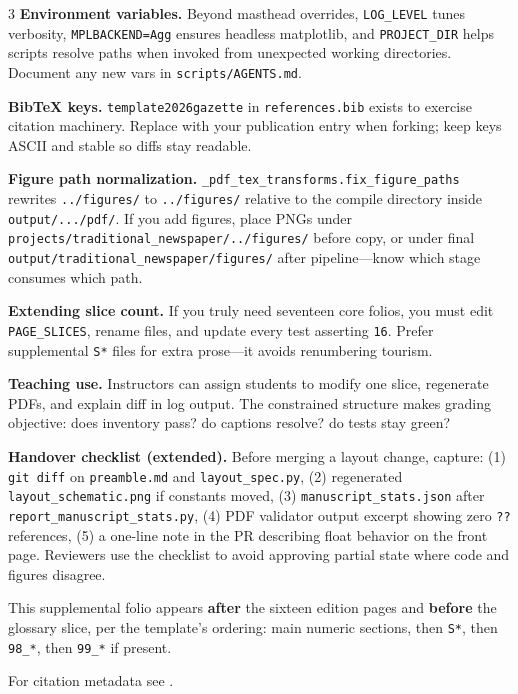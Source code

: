 \documentclass[
]{article}
\begin{document}
\begin{multicols}{3}
\textbf{Environment variables.} Beyond masthead overrides,
\texttt{LOG\_LEVEL} tunes verbosity, \texttt{MPLBACKEND=Agg} ensures
headless matplotlib, and \texttt{PROJECT\_DIR} helps scripts resolve
paths when invoked from unexpected working directories. Document any new
vars in \texttt{scripts/AGENTS.md}.

\textbf{BibTeX keys.} \texttt{template2026gazette} in
\texttt{references.bib} exists to exercise citation machinery. Replace
with your publication entry when forking; keep keys ASCII and stable so
diffs stay readable.

\textbf{Figure path normalization.}
\texttt{\_pdf\_tex\_transforms.fix\_figure\_paths} rewrites
\texttt{../figures/} to \texttt{../figures/} relative to the compile
directory inside \texttt{output/.../pdf/}. If you add figures, place
PNGs under \texttt{projects/traditional\_newspaper/../figures/} before
copy, or under final \texttt{output/traditional\_newspaper/figures/}
after pipeline---know which stage consumes which path.

\textbf{Extending slice count.} If you truly need seventeen core folios,
you must edit \texttt{PAGE\_SLICES}, rename files, and update every test
asserting \texttt{16}. Prefer supplemental \texttt{S*} files for extra
prose---it avoids renumbering tourism.

\textbf{Teaching use.} Instructors can assign students to modify one
slice, regenerate PDFs, and explain diff in log output. The constrained
structure makes grading objective: does inventory pass? do captions
resolve? do tests stay green?

\textbf{Handover checklist (extended).} Before merging a layout change,
capture: (1) \texttt{git\ diff} on \texttt{preamble.md} and
\texttt{layout\_spec.py}, (2) regenerated \texttt{layout\_schematic.png}
if constants moved, (3) \texttt{manuscript\_stats.json} after
\texttt{report\_manuscript\_stats.py}, (4) PDF validator output excerpt
showing zero \texttt{??} references, (5) a one-line note in the PR
describing float behavior on the front page. Reviewers use the checklist
to avoid approving partial state where code and figures disagree.

This supplemental folio appears \textbf{after} the sixteen edition pages
and \textbf{before} the glossary slice, per the template's ordering:
main numeric sections, then \texttt{S*}, then \texttt{98\_*}, then
\texttt{99\_*} if present.

\noindent For citation metadata see \cite{template2026gazette}.
\par\smallskip

\end{multicols}
\end{document}
